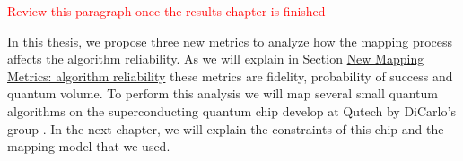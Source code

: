\textcolor{red}{Review this paragraph once the results chapter is finished}

In this thesis, we propose three new metrics to analyze how the mapping process affects the algorithm reliability. As we will explain in Section \hyperref[sec:org27990de]{New Mapping Metrics: algorithm reliability} these metrics are fidelity, probability of success and quantum volume. 
To perform this analysis we will map several small quantum algorithms on the superconducting quantum chip develop at Qutech by DiCarlo's group 
\cite{Versluis_2017}.
In the next chapter, we will explain the constraints of this chip and the mapping model that we used.
